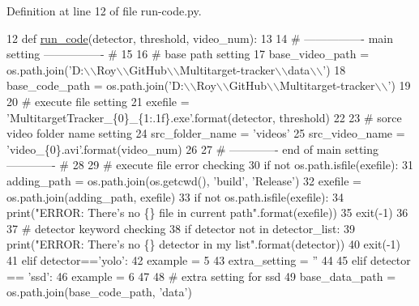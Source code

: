 Definition at line 12 of file run-\/code.\+py.


\begin{DoxyCode}
12 \textcolor{keyword}{def }\mbox{\hyperlink{namespacerun-code_a133159db4bd6772312bbf5daa57bd0b3}{run\_code}}(detector, threshold, video\_num):
13 
14     \textcolor{comment}{# ---------------- main setting ---------------- #}
15 
16     \textcolor{comment}{# base path setting}
17     base\_video\_path = os.path.join(\textcolor{stringliteral}{'D:\(\backslash\)\(\backslash\)Roy\(\backslash\)\(\backslash\)GitHub\(\backslash\)\(\backslash\)Multitarget-tracker\(\backslash\)\(\backslash\)data\(\backslash\)\(\backslash\)'})
18     base\_code\_path = os.path.join(\textcolor{stringliteral}{'D:\(\backslash\)\(\backslash\)Roy\(\backslash\)\(\backslash\)GitHub\(\backslash\)\(\backslash\)Multitarget-tracker\(\backslash\)\(\backslash\)'})
19 
20     \textcolor{comment}{# execute file setting}
21     exefile = \textcolor{stringliteral}{'MultitargetTracker\_\{0\}\_\{1:.1f\}.exe'}.format(detector, threshold)
22 
23     \textcolor{comment}{# sorce video folder name setting}
24     src\_folder\_name = \textcolor{stringliteral}{'videos'}
25     src\_video\_name = \textcolor{stringliteral}{'video\_\{0\}.avi'}.format(video\_num)
26 
27     \textcolor{comment}{# ------------- end of main setting ------------- #}
28 
29     \textcolor{comment}{# execute file error checking}
30     \textcolor{keywordflow}{if} \textcolor{keywordflow}{not} os.path.isfile(exefile):
31         adding\_path = os.path.join(os.getcwd(), \textcolor{stringliteral}{'build'}, \textcolor{stringliteral}{'Release'})
32         exefile = os.path.join(adding\_path, exefile)
33         \textcolor{keywordflow}{if} \textcolor{keywordflow}{not} os.path.isfile(exefile):
34             print(\textcolor{stringliteral}{"ERROR: There's no \{\} file in current path"}.format(exefile))
35             exit(-1)
36 
37     \textcolor{comment}{# detector keyword checking}
38     \textcolor{keywordflow}{if} detector \textcolor{keywordflow}{not} \textcolor{keywordflow}{in} detector\_list:
39         print(\textcolor{stringliteral}{"ERROR: There's no \{\} detector in my list"}.format(detector))
40         exit(-1)
41     \textcolor{keywordflow}{elif} detector==\textcolor{stringliteral}{'yolo'}:
42         example = 5
43         extra\_setting = \textcolor{stringliteral}{''}
44 
45     \textcolor{keywordflow}{elif} detector == \textcolor{stringliteral}{'ssd'}:
46         example = 6
47 
48         \textcolor{comment}{# extra setting for ssd}
49         base\_data\_path = os.path.join(base\_code\_path, \textcolor{stringliteral}{'data'})

\end{DoxyCode}
